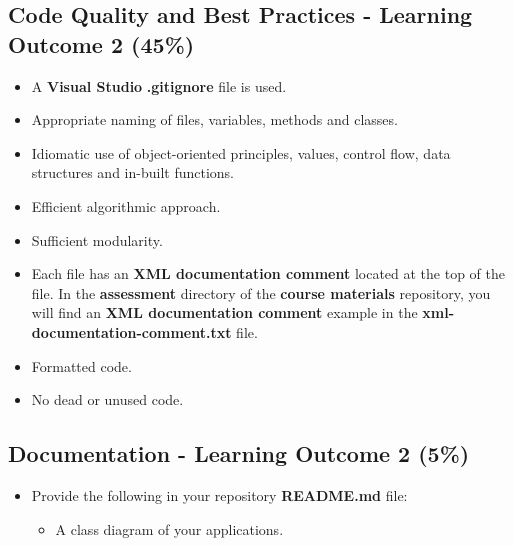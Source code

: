 \documentclass{article}
\begin{document}
\subsection*{Code Quality and Best Practices - Learning Outcome 2 (45\%)}
\begin{itemize}
    \item A \textbf{Visual Studio} \textbf{.gitignore} file is used. 
    \item Appropriate naming of files, variables, methods and classes.
    \item Idiomatic use of object-oriented principles, values, control flow, data structures and in-built functions.
    \item Efficient algorithmic approach.
    \item Sufficient modularity.
    \item Each file has an \textbf{XML documentation comment} located at the top of the file. In the \textbf{assessment} directory of the \textbf{course materials} repository, you will find an \textbf{XML documentation comment} example in the \textbf{xml-documentation-comment.txt} file.
    \item Formatted code.
    \item No dead or unused code.
\end{itemize}

\subsection*{Documentation - Learning Outcome 2 (5\%)}
\begin{itemize}
    \item Provide the following in your repository \textbf{README.md} file:
    \begin{itemize}
        \item A class diagram of your applications.
    \end{itemize}
\end{itemize}
\end{document}
